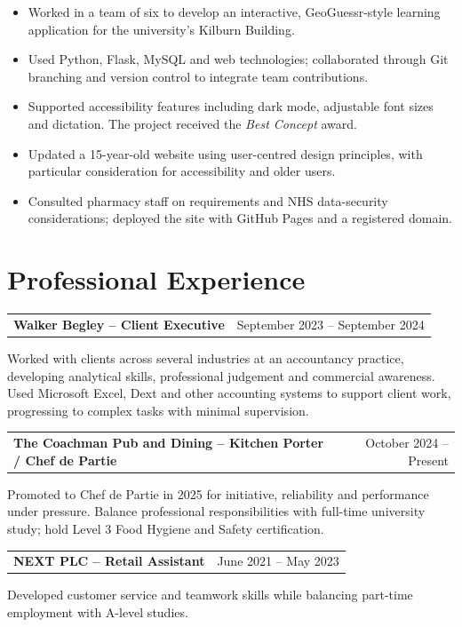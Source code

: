 \documentclass[11pt,a4paper]{article}
\makeatletter
\newcommand{\datedheading}[2]{%
 \noindent\begin{tabularx}{\linewidth}{@{}>{\raggedright\arraybackslash}X>{\raggedleft\arraybackslash}r@{}}
 \textbf{#1} & {\small\color{muted}#2}
 \end{tabularx}\par
}
\newcommand{\projectheading}[1]{\needspace{5\baselineskip}\vspace{3pt}{\bfseries #1}\par\vspace{-1pt}}
\newcommand{\workheading}[2]{\needspace{4\baselineskip}\vspace{4pt}\datedheading{#1}{#2}\vspace{1pt}}
\makeatother
\begin{document}
\projectheading{Kilburn Klues: Accessible Learning Platform -- University of Manchester}
\begin{itemize}
 \item Worked in a team of six to develop an interactive, GeoGuessr-style learning application for the university's Kilburn Building.
 \item Used Python, Flask, MySQL and web technologies; collaborated through Git branching and version control to integrate team contributions.
 \item Supported accessibility features including dark mode, adjustable font sizes and dictation. The project received the \emph{Best Concept} award.
\end{itemize}

\projectheading{Moston Pharmacy: Website Modernisation}
\begin{itemize}
 \item Updated a 15-year-old website using user-centred design principles, with particular consideration for accessibility and older users.
 \item Consulted pharmacy staff on requirements and NHS data-security considerations; deployed the site with GitHub Pages and a registered domain.
\end{itemize}

\section*{Professional Experience}
\workheading{Walker Begley -- Client Executive}{September 2023 -- September 2024}
Worked with clients across several industries at an accountancy practice, developing analytical skills, professional judgement and commercial awareness. Used Microsoft Excel, Dext and other accounting systems to support client work, progressing to complex tasks with minimal supervision.

\workheading{The Coachman Pub and Dining -- Kitchen Porter / Chef de Partie}{October 2024 -- Present}
Promoted to Chef de Partie in 2025 for initiative, reliability and performance under pressure. Balance professional responsibilities with full-time university study; hold Level 3 Food Hygiene and Safety certification.

\workheading{NEXT PLC -- Retail Assistant}{June 2021 -- May 2023}
Developed customer service and teamwork skills while balancing part-time employment with A-level studies.
\end{document}
